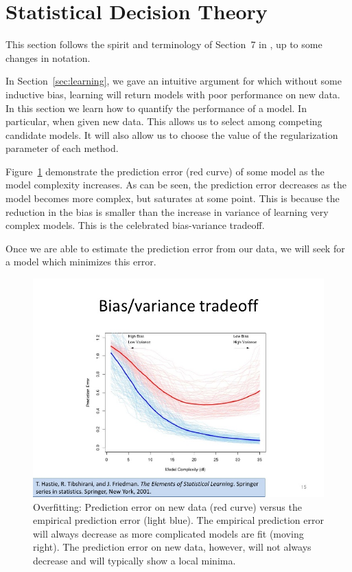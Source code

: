 \documentclass[12pt,a4paper]{article}
\theoremstyle{plain}
\theoremstyle{definition}
\begin{document}

\section{Statistical Decision Theory}
\label{sec:desicion_theory}

This section follows the spirit and terminology of Section~7 in \cite{hastie_elements_2003}, up to some changes in notation.

In Section~\ref{sec:learning}, we gave an intuitive argument for which without some inductive bias, learning will return models with poor performance on new data.
In this section we learn how to quantify the performance of a model. In particular, when given new data. This allows us to select among competing candidate models. It will also allow us to choose the value of the regularization parameter of each method.

Figure~\ref{fig:bias_variance} demonstrate the prediction error (red curve) of some model as the model complexity increases. As can be seen, the prediction error decreases as the model becomes more complex, but saturates at some point. 
This is because the reduction in the bias is smaller than the increase in variance of learning very complex models.
This is the celebrated bias-variance tradeoff.

Once we are able to estimate the prediction error from our data, we will seek for a model which minimizes this error.

\begin{figure}[h]
        \centering
        \includegraphics[width=1\textwidth]{art/support-vector-machine-15-728}
        \caption{Overfitting: 
        Prediction error on new data (red curve) versus the empirical prediction error (light blue).
        The empirical prediction error will always decrease as more complicated models are fit (moving right).
        The prediction error on new data, however, will not always decrease and will typically show a local minima.
        \label{fig:bias_variance}}
\end{figure}
\end{document}
